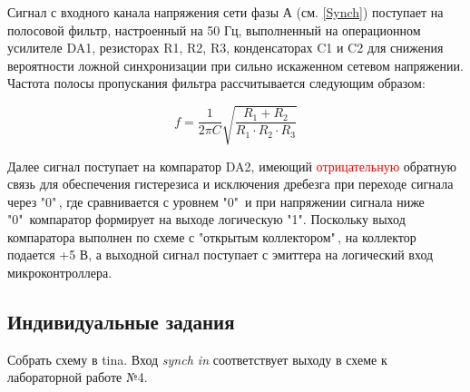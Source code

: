 Сигнал с входного канала напряжения сети фазы А (см. \ref{Synch}) поступает на полосовой фильтр, настроенный на 50 Гц, 
выполненный на операционном усилителе DA1, резисторах R1, R2, R3, конденсаторах C1 и C2 для снижения вероятности ложной синхронизации 
при сильно искаженном сетевом напряжении. Частота полосы пропускания фильтра рассчитывается следующим образом:

\begin{equation}
	f = \frac{1}{2\pi C} \sqrt{\frac{R_1+R_2}{R_1\cdot R_2 \cdot R_3}}
\label{f}
\end{equation}

 Далее сигнал поступает на компаратор DA2, имеющий \textcolor{red}{отрицательную} обратную связь для обеспечения гистерезиса и исключения дребезга 
 при переходе сигнала через "$0$"\,, где сравнивается с уровнем "0"\  и при напряжении сигнала ниже "0"\  компаратор формирует на выходе логическую "1". 
 Поскольку выход компаратора выполнен по схеме с "открытым коллектором"\,, на коллектор подается +5 В, 
 а выходной сигнал поступает с эмиттера на логический вход микроконтроллера.

\subsection{Индивидуальные задания}

Собрать схему в tina. Вход {\it synch in} соответствует выходу в схеме к лабораторной работе №4. 

